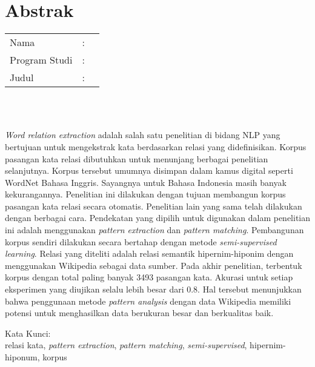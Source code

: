 %
%
%

\chapter*{Abstrak}

\vspace*{0.2cm}

\noindent \begin{tabular}{l l p{10cm}}
	Nama&: & \penulis \\
	Program Studi&: & \program \\
	Judul&: & \judul \\
\end{tabular} \\ 

\vspace*{0.5cm}

\noindent 
\\ \textit{Word relation extraction} adalah salah satu penelitian di bidang NLP yang bertujuan untuk mengekstrak kata berdasarkan relasi yang didefinisikan. Korpus pasangan kata relasi dibutuhkan untuk menunjang berbagai penelitian selanjutnya. Korpus tersebut umumnya disimpan dalam kamus digital seperti WordNet Bahasa Inggris. Sayangnya untuk Bahasa Indonesia masih banyak kekurangannya. Penelitian ini dilakukan dengan tujuan membangun korpus pasangan kata relasi secara otomatis. Penelitian lain yang sama telah dilakukan dengan berbagai cara. Pendekatan yang dipilih untuk digunakan dalam penelitian ini adalah menggunakan \textit{pattern extraction} dan \textit{pattern matching}. Pembangunan korpus sendiri dilakukan secara bertahap dengan metode \textit{semi-supervised learning}. Relasi yang diteliti adalah relasi semantik hipernim-hiponim dengan menggunakan Wikipedia sebagai data sumber. Pada akhir penelitian, terbentuk korpus dengan total paling banyak 3493 pasangan kata. Akurasi untuk setiap eksperimen yang diujikan selalu lebih besar dari 0.8. Hal tersebut menunjukkan bahwa penggunaan metode \textit{pattern analysis} dengan data Wikipedia memiliki potensi untuk menghasilkan data berukuran besar dan berkualitas baik.

\vspace*{0.2cm}

\noindent Kata Kunci: \\ 
\noindent relasi kata, \textit{pattern extraction}, \textit{pattern matching}, \textit{semi-supervised}, hipernim-hiponum, korpus\\ 

\newpage
